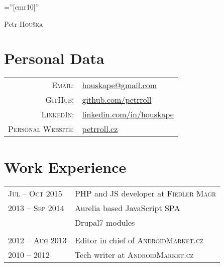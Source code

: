 \documentclass[a4paper,10pt]{article}
\newcommand{\rightcol}{11.2cm}
\newcommand{\leftcol}{2.8cm}
\begin{document}
\pagestyle{empty} %
\font\fb=''[cmr10]'' %

\par{\centering
		{\Huge Petr \textsc{Houška} 
	}\bigskip\par}


\section{Personal Data}

\begin{tabular}{rl}
    \textsc{Email:}     & \href{mailto:houskape@gmail.com}{houskape@gmail.com} \\
    \textsc{GitHub:}	& \href{https://github.com/petrroll/}{github.com/petrroll} \\
    \textsc{LinkedIn:}	& \href{https://linkedin.com/in/houskape}{linkedin.com/in/houskape} \\
    \textsc{Personal Website:}	& \href{http://petrroll.cz}{petrroll.cz}\\
\end{tabular}

\section{Work Experience}
\begin{tabular}{p{\leftcol}|p{\rightcol}}
\textsc{Jul -- Oct 2015}    & PHP and JS developer at \textsc{Fiedler Magr}\\
\textsc{2013 -- Sep 2014}   & \footnotesize{Aurelia based JavaScript SPA}\\
                            & \footnotesize{Drupal7 modules}\\

\multicolumn{2}{c}{} \\                    
                    
\textsc{2012 -- Aug 2013} & Editor in chief of \textsc{AndroidMarket.cz}\\
\textsc{2010 -- 2012} & Tech writer at \textsc{AndroidMarket.cz}\\
\end{tabular}
\end{document}
